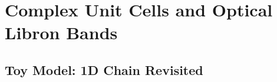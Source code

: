\documentclass[12pt]{article}
\begin{document}


\section{Complex Unit Cells and Optical Libron Bands}

\subsection{Toy Model: 1D Chain Revisited}
\end{document}
